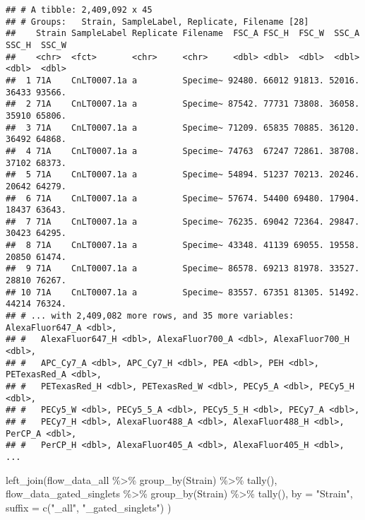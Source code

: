 \documentclass[
]{article}
\newenvironment{Shaded}{\begin{snugshade}}{\end{snugshade}}
\newcommand{\AttributeTok}[1]{\textcolor[rgb]{0.77,0.63,0.00}{#1}}
\newcommand{\FunctionTok}[1]{\textcolor[rgb]{0.00,0.00,0.00}{#1}}
\newcommand{\NormalTok}[1]{#1}
\newcommand{\SpecialCharTok}[1]{\textcolor[rgb]{0.00,0.00,0.00}{#1}}
\newcommand{\StringTok}[1]{\textcolor[rgb]{0.31,0.60,0.02}{#1}}
\begin{document}
\begin{verbatim}
## # A tibble: 2,409,092 x 45
## # Groups:   Strain, SampleLabel, Replicate, Filename [28]
##    Strain SampleLabel Replicate Filename  FSC_A FSC_H  FSC_W  SSC_A SSC_H  SSC_W
##    <chr>  <fct>       <chr>     <chr>     <dbl> <dbl>  <dbl>  <dbl> <dbl>  <dbl>
##  1 71A    CnLT0007.1a a         Specime~ 92480. 66012 91813. 52016. 36433 93566.
##  2 71A    CnLT0007.1a a         Specime~ 87542. 77731 73808. 36058. 35910 65806.
##  3 71A    CnLT0007.1a a         Specime~ 71209. 65835 70885. 36120. 36492 64868.
##  4 71A    CnLT0007.1a a         Specime~ 74763  67247 72861. 38708. 37102 68373.
##  5 71A    CnLT0007.1a a         Specime~ 54894. 51237 70213. 20246. 20642 64279.
##  6 71A    CnLT0007.1a a         Specime~ 57674. 54400 69480. 17904. 18437 63643.
##  7 71A    CnLT0007.1a a         Specime~ 76235. 69042 72364. 29847. 30423 64295.
##  8 71A    CnLT0007.1a a         Specime~ 43348. 41139 69055. 19558. 20850 61474.
##  9 71A    CnLT0007.1a a         Specime~ 86578. 69213 81978. 33527. 28810 76267.
## 10 71A    CnLT0007.1a a         Specime~ 83557. 67351 81305. 51492. 44214 76324.
## # ... with 2,409,082 more rows, and 35 more variables: AlexaFluor647_A <dbl>,
## #   AlexaFluor647_H <dbl>, AlexaFluor700_A <dbl>, AlexaFluor700_H <dbl>,
## #   APC_Cy7_A <dbl>, APC_Cy7_H <dbl>, PEA <dbl>, PEH <dbl>, PETexasRed_A <dbl>,
## #   PETexasRed_H <dbl>, PETexasRed_W <dbl>, PECy5_A <dbl>, PECy5_H <dbl>,
## #   PECy5_W <dbl>, PECy5_5_A <dbl>, PECy5_5_H <dbl>, PECy7_A <dbl>,
## #   PECy7_H <dbl>, AlexaFluor488_A <dbl>, AlexaFluor488_H <dbl>, PerCP_A <dbl>,
## #   PerCP_H <dbl>, AlexaFluor405_A <dbl>, AlexaFluor405_H <dbl>, ...
\end{verbatim}

\begin{Shaded}
\begin{Highlighting}[]
\FunctionTok{left\_join}\NormalTok{(flow\_data\_all }\SpecialCharTok{\%\textgreater{}\%}
            \FunctionTok{group\_by}\NormalTok{(Strain) }\SpecialCharTok{\%\textgreater{}\%}
            \FunctionTok{tally}\NormalTok{(),}
\NormalTok{          flow\_data\_gated\_singlets }\SpecialCharTok{\%\textgreater{}\%}
            \FunctionTok{group\_by}\NormalTok{(Strain) }\SpecialCharTok{\%\textgreater{}\%}
            \FunctionTok{tally}\NormalTok{(),}
          \AttributeTok{by =} \StringTok{"Strain"}\NormalTok{,}
          \AttributeTok{suffix =} \FunctionTok{c}\NormalTok{(}\StringTok{"\_all"}\NormalTok{, }\StringTok{"\_gated\_singlets"}\NormalTok{) )}
\end{Highlighting}
\end{Shaded}
\end{document}
